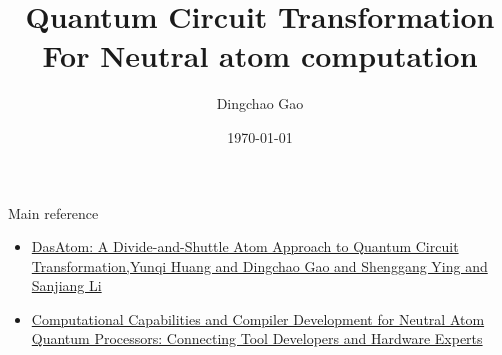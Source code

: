 \documentclass{beamer}
\author{Dingchao Gao}
\title{Quantum Circuit Transformation For Neutral atom computation}
\institute{ISCAS}
\date{\today}
\begin{document}

\begin{frame}
    \titlepage
\end{frame}
\begin{frame}{Main reference}
    \begin{itemize}
        \item \href{https://arxiv.org/abs/2409.03185}{DasAtom: A Divide-and-Shuttle Atom Approach to Quantum Circuit Transformation,Yunqi Huang and Dingchao Gao and Shenggang Ying and Sanjiang Li}
        \item \href{https://arxiv.org/abs/2309.08656}{Computational Capabilities and Compiler Development for Neutral Atom Quantum Processors: Connecting Tool Developers and Hardware Experts}
        
    \end{itemize}
\end{frame}



\end{document}

